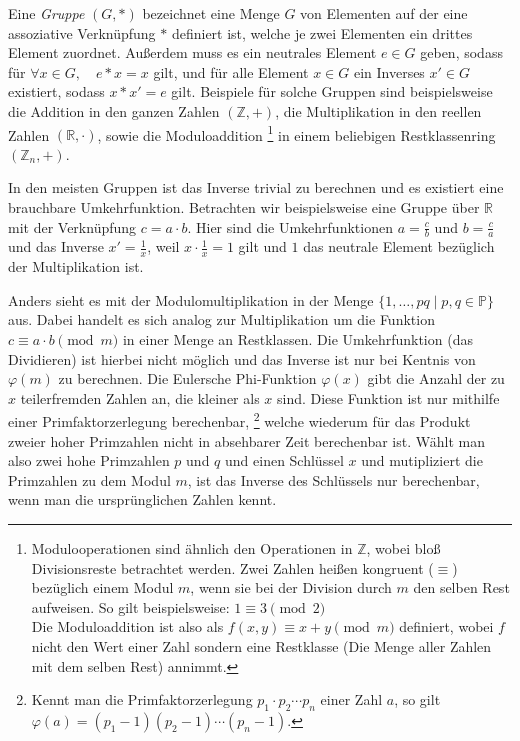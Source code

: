 Eine \emph{Gruppe} $(G,*)$ bezeichnet eine Menge $G$ von Elementen auf der eine assoziative Verknüpfung $*$ definiert ist, welche je zwei Elementen ein drittes Element zuordnet.
Außerdem muss es ein neutrales Element $e \in G$ geben, sodass für $\forall x \in G, \quad e*x=x$ gilt, und für alle Element $x \in G$ ein Inverses $x' \in G$ existiert, sodass $x*x'=e$ gilt.
Beispiele für solche Gruppen sind beispielsweise die Addition in den ganzen Zahlen $(\mathbb{Z}, +)$, die Multiplikation in den reellen Zahlen $(\mathbb{R}, \cdot)$, sowie die Moduloaddition%
\footnote{Modulooperationen sind ähnlich den Operationen in $\mathbb{Z}$, wobei bloß Divisionsreste betrachtet werden.
Zwei Zahlen heißen kongruent ($\equiv$) bezüglich einem Modul $m$, wenn sie bei der Division durch $m$ den selben Rest aufweisen.
So gilt beispielsweise: $1 \equiv 3 \pmod{2}$ \\
Die Moduloaddition ist also als $f(x,y) \equiv x+y \pmod{m}$ definiert, wobei $f$ nicht den Wert einer Zahl sondern eine Restklasse (Die Menge aller Zahlen mit dem selben Rest) annimmt.}
in einem beliebigen Restklassenring $(\mathbb{Z}_n, +)$.

In den meisten Gruppen ist das Inverse trivial zu berechnen und es existiert eine brauchbare Umkehrfunktion.
Betrachten wir beispielsweise eine Gruppe über $\mathbb{R}$ mit der Verknüpfung $c = a \cdot b$.
Hier sind die Umkehrfunktionen $a = \frac{c}{b}$ und $b = \frac{c}{a}$ und das Inverse $x'=\frac{1}{x}$, weil $x \cdot \frac{1}{x} = 1$ gilt und $1$ das neutrale Element bezüglich der Multiplikation ist.

Anders sieht es mit der Modulomultiplikation in der Menge $\{ 1, \dotsc, pq \mid p,q \in \mathbb{P}\}$ aus.
Dabei handelt es sich analog zur Multiplikation um die Funktion $c \equiv a \cdot b \pmod{m}$ in einer Menge an Restklassen.
Die Umkehrfunktion (das Dividieren) ist hierbei nicht möglich und das Inverse ist nur bei Kentnis von $\varphi(m)$ zu berechnen.
Die Eulersche Phi-Funktion $\varphi(x)$ gibt die Anzahl der zu $x$ teilerfremden Zahlen an, die kleiner als $x$ sind.
Diese Funktion ist nur mithilfe einer Primfaktorzerlegung berechenbar,%
\footnote{Kennt man die Primfaktorzerlegung $p_1 \cdot p_2 \dotsm p_n$ einer Zahl $a$, so gilt $\varphi (a) = (p_1-1) (p_2-1) \dotsm (p_n-1)$.}
welche wiederum für das Produkt zweier hoher Primzahlen nicht in absehbarer Zeit berechenbar ist.
Wählt man also zwei hohe Primzahlen $p$ und $q$ und einen Schlüssel $x$ und mutipliziert die Primzahlen zu dem Modul $m$, ist das Inverse des Schlüssels nur berechenbar, wenn man die ursprünglichen Zahlen kennt.

